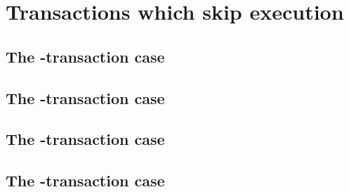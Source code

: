 

\section{Transactions which skip \evm{} execution } %
\subsection{The \sysi{}-transaction                     case} \label{hub: tx skip: sysi} 
\subsection{The \user{}-transaction                     case} \label{hub: tx skip: user} 
\subsection{The \sysf{}-transaction                     case} \label{hub: tx skip: sysf} 
\subsection{The \txnSystemTransactionNoop{}-transaction case} \label{hub: tx skip: sysi} 
